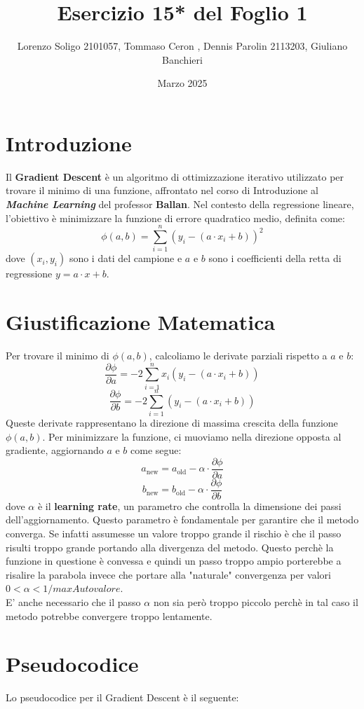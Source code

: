 \documentclass{article}
\title{Esercizio 15* del Foglio 1}
\author{Lorenzo Soligo 2101057, Tommaso Ceron , Dennis Parolin 2113203, Giuliano Banchieri}
\date{Marzo 2025}
\begin{document}
\maketitle

\section{Introduzione}
Il \textbf{Gradient Descent} è un algoritmo di ottimizzazione iterativo utilizzato per trovare il minimo di una funzione, affrontato nel corso di Introduzione al \textbf{\textit{Machine Learning}} del professor \textbf{Ballan}. Nel contesto della regressione lineare, l'obiettivo è minimizzare la funzione di errore quadratico medio, definita come:
\[
\phi(a, b) = \sum_{i=1}^n (y_i - (a \cdot x_i + b))^2
\]
dove \((x_i, y_i)\) sono i dati del campione e \(a\) e \(b\) sono i coefficienti della retta di regressione \(y = a \cdot x + b\).

\section{Giustificazione Matematica}
Per trovare il minimo di \(\phi(a, b)\), calcoliamo le derivate parziali rispetto a \(a\) e \(b\):
\[
\frac{\partial \phi}{\partial a} = -2 \sum_{i=1}^n x_i (y_i - (a \cdot x_i + b))
\]
\[
\frac{\partial \phi}{\partial b} = -2 \sum_{i=1}^n (y_i - (a \cdot x_i + b))
\]
Queste derivate rappresentano la direzione di massima crescita della funzione \(\phi(a, b)\). Per minimizzare la funzione, ci muoviamo nella direzione opposta al gradiente, aggiornando \(a\) e \(b\) come segue:
\[
a_{\text{new}} = a_{\text{old}} - \alpha \cdot \frac{\partial \phi}{\partial a}
\]
\[
b_{\text{new}} = b_{\text{old}} - \alpha \cdot \frac{\partial \phi}{\partial b}
\]
dove \(\alpha\) è il \textbf{learning rate}, un parametro che controlla la dimensione dei passi dell'aggiornamento. Questo parametro  è fondamentale per garantire che il metodo converga. Se infatti assumesse un valore troppo grande il rischio è che il passo risulti troppo grande portando alla divergenza del metodo. Questo perchè la funzione in questione è convessa e quindi un passo troppo ampio porterebbe a risalire la parabola invece che portare alla "naturale" convergenza per valori $0<\alpha<1/maxAutovalore$.\\
E' anche necessario che il passo $\alpha$ non sia però troppo piccolo perchè in tal caso il metodo potrebbe convergere troppo lentamente.

\section{Pseudocodice}
Lo pseudocodice per il Gradient Descent è il seguente:
\end{document}
